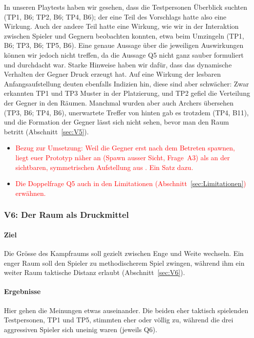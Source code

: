 \documentclass[../Main.tex]{subfiles}
\begin{document}
In unseren Playtests haben wir gesehen, dass die Testpersonen Überblick suchten (TP1, B6; TP2, B6; TP4, B6); der eine Teil des Vorschlags hatte also eine Wirkung. Auch der andere Teil hatte eine Wirkung, wie wir in der Interaktion zwischen Spieler und Gegnern beobachten konnten, etwa beim Umzingeln (TP1, B6; TP3, B6; TP5, B6). Eine genaue Aussage über die jeweiligen Auswirkungen können wir jedoch nicht treffen, da die Aussage Q5 nicht ganz sauber formuliert und durchdacht war. Starke Hinweise haben wir dafür, dass das dynamische Verhalten der Gegner Druck erzeugt hat. Auf eine Wirkung der lesbaren Anfangsaufstellung deuten ebenfalls Indizien hin, diese sind aber schwächer: Zwar erkannten TP1 und TP3 Muster in der Platzierung, und TP2 gefiel die Verteilung der Gegner in den Räumen. Manchmal wurden aber auch Archers übersehen (TP3, B6; TP4, B6), unerwartete Treffer von hinten gab es trotzdem (TP4, B11), und die Formation der Gegner lässt sich nicht sehen, bevor man den Raum betritt (Abschnitt~\ref{sec:V5}).

\begin{itemize}[leftmargin=1.5cm]
    \item \textcolor{red}{Bezug zur Umsetzung: Weil die Gegner erst nach dem Betreten spawnen, liegt euer Prototyp näher an  (Spawn ausser Sicht, Frage~A3) als an der sichtbaren, symmetrischen Aufstellung aus . Ein Satz dazu.}
    \item \textcolor{red}{Die Doppelfrage Q5 auch in den Limitationen (Abschnitt~\ref{sec:Limitationen}) erwähnen.}
\end{itemize}

\subsubsection{V6: Der Raum als Druckmittel}

\paragraph{Ziel}
Die Grösse des Kampfraums soll gezielt zwischen Enge und Weite wechseln. Ein enger Raum soll den Spieler zu methodischerem Spiel zwingen, während ihm ein weiter Raum taktische Distanz erlaubt (Abschnitt~\ref{sec:V6}).

\paragraph{Ergebnisse}
Hier gehen die Meinungen etwas auseinander. Die beiden eher taktisch spielenden Testpersonen, TP1 und TP5, stimmten eher oder völlig zu, während die drei aggressiven Spieler sich uneinig waren (jeweils Q6).
\end{document}
